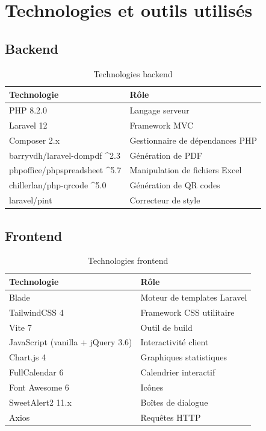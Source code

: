 \documentclass[12pt,a4paper,twoside]{report}
\begin{document}
\section{Technologies et outils utilisés}

\subsection{Backend}

\begin{table}[h]
\centering
\caption{Technologies backend}
\begin{tabular}{ll}
\toprule
Technologie & Rôle \\
\midrule
PHP 8.2.0 & Langage serveur \\
Laravel 12 & Framework MVC \\
Composer 2.x & Gestionnaire de dépendances PHP \\
barryvdh/laravel-dompdf ^2.3 & Génération de PDF \\
phpoffice/phpspreadsheet ^5.7 & Manipulation de fichiers Excel \\
chillerlan/php-qrcode ^5.0 & Génération de QR codes \\
laravel/pint & Correcteur de style \\
\bottomrule
\end{tabular}
\end{table}

\subsection{Frontend}

\begin{table}[h]
\centering
\caption{Technologies frontend}
\begin{tabular}{ll}
\toprule
Technologie & Rôle \\
\midrule
Blade & Moteur de templates Laravel \\
TailwindCSS 4 & Framework CSS utilitaire \\
Vite 7 & Outil de build \\
JavaScript (vanilla + jQuery 3.6) & Interactivité client \\
Chart.js 4 & Graphiques statistiques \\
FullCalendar 6 & Calendrier interactif \\
Font Awesome 6 & Icônes \\
SweetAlert2 11.x & Boîtes de dialogue \\
Axios & Requêtes HTTP \\
\bottomrule
\end{tabular}
\end{table}
\end{document}

